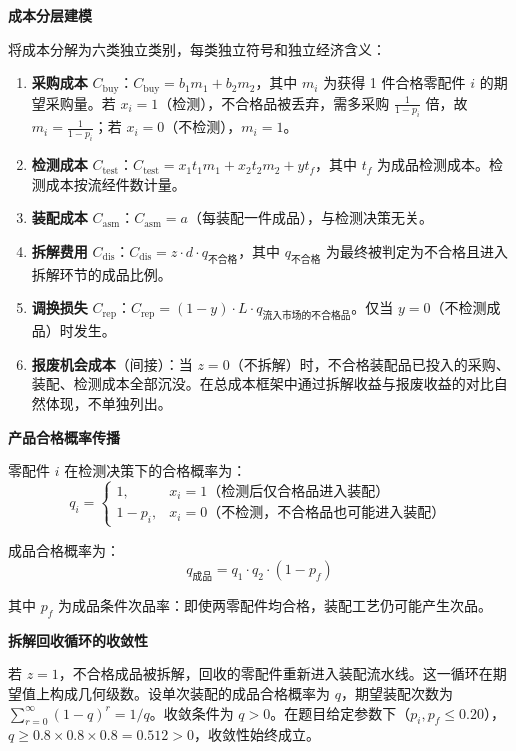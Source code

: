 \documentclass[12pt,a4paper]{ctexart}
\begin{document}
\textbf{成本分层建模}

将成本分解为六类独立类别，每类独立符号和独立经济含义：

\begin{enumerate}[label=\arabic*., leftmargin=2em]
    \item \textbf{采购成本} $C_{\text{buy}}$：$C_{\text{buy}} = b_1 m_1 + b_2 m_2$，其中 $m_i$ 为获得 1 件合格零配件 $i$ 的期望采购量。若 $x_i=1$（检测），不合格品被丢弃，需多采购 $\frac{1}{1-p_i}$ 倍，故 $m_i = \frac{1}{1-p_i}$；若 $x_i=0$（不检测），$m_i=1$。
    \item \textbf{检测成本} $C_{\text{test}}$：$C_{\text{test}} = x_1 t_1 m_1 + x_2 t_2 m_2 + y t_f$，其中 $t_f$ 为成品检测成本。检测成本按流经件数计量。
    \item \textbf{装配成本} $C_{\text{asm}}$：$C_{\text{asm}} = a$（每装配一件成品），与检测决策无关。
    \item \textbf{拆解费用} $C_{\text{dis}}$：$C_{\text{dis}} = z \cdot d \cdot q_{\text{不合格}}$，其中 $q_{\text{不合格}}$ 为最终被判定为不合格且进入拆解环节的成品比例。
    \item \textbf{调换损失} $C_{\text{rep}}$：$C_{\text{rep}} = (1-y) \cdot L \cdot q_{\text{流入市场的不合格品}}$。仅当 $y=0$（不检测成品）时发生。
    \item \textbf{报废机会成本}（间接）：当 $z=0$（不拆解）时，不合格装配品已投入的采购、装配、检测成本全部沉没。在总成本框架中通过拆解收益与报废收益的对比自然体现，不单独列出。
\end{enumerate}

\textbf{产品合格概率传播}

零配件 $i$ 在检测决策下的合格概率为：
\begin{equation}
q_i = \begin{cases}
1, & x_i=1 \text{（检测后仅合格品进入装配）} \\
1-p_i, & x_i=0 \text{（不检测，不合格品也可能进入装配）}
\end{cases}
\end{equation}

成品合格概率为：
\begin{equation}
q_{\text{成品}} = q_1 \cdot q_2 \cdot (1-p_f)
\end{equation}

其中 $p_f$ 为成品条件次品率：即使两零配件均合格，装配工艺仍可能产生次品。

\textbf{拆解回收循环的收敛性}

若 $z=1$，不合格成品被拆解，回收的零配件重新进入装配流水线。这一循环在期望值上构成几何级数。设单次装配的成品合格概率为 $q$，期望装配次数为 $\sum_{r=0}^\infty (1-q)^r = 1/q$。收敛条件为 $q > 0$。在题目给定参数下（$p_i,p_f\le 0.20$），$q \ge 0.8 \times 0.8 \times 0.8 = 0.512 > 0$，收敛性始终成立。
\end{document}
